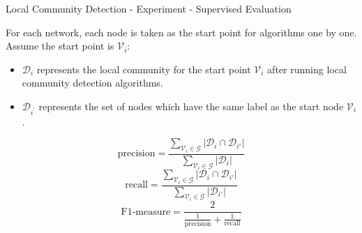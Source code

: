 \documentclass[9pt]{beamer}
\begin{document}
\begin{frame}{Local Community Detection - Experiment - Supervised Evaluation}

For each network, each node is taken as the start point for algorithms one by one. Assume the start point is $\mathcal{V}_i$:

\begin{itemize}
\item $\mathcal{D}_{i}$ represents the local community for the start point $\mathcal{V}_i$ after running local community detection algorithms.
\item $\mathcal{D}_{i^\prime}$ represents the set of nodes which have the same label as the start node $\mathcal{V}_i$.
\end{itemize}

\begin{equation}
\text{precision} = \frac{\sum_{\mathcal{V}_i\in \mathcal{G}}|\mathcal{D}_{i} \cap \mathcal{D}_{i\prime}|}{\sum_{\mathcal{V}_i\in \mathcal{G}}|\mathcal{D}_{i}|}
\end{equation}
\begin{equation}
\text{recall} = \frac{\sum_{\mathcal{V}_i\in \mathcal{G}}|\mathcal{D}_{i} \cap \mathcal{D}_{i\prime}|}{\sum_{\mathcal{V}_i\in \mathcal{G}}|\mathcal{D}_{i\prime}|}
\end{equation}
\begin{equation}
\text{F1-measure} = \frac{2}{\frac{1}{\text{precision}}+\frac{1}{\text{recall}}}
\end{equation}

\end{frame}
\end{document}
